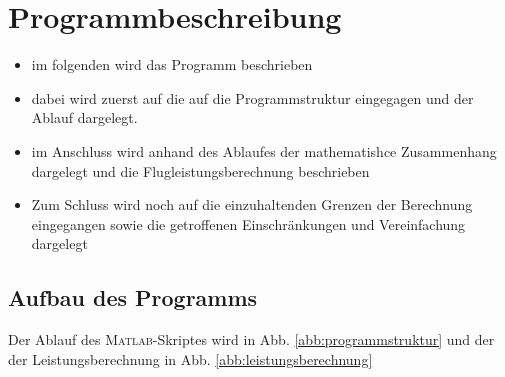 \chapter{Programmbeschreibung}
\label{chap:Programmbeschreibung}
\begin{itemize}
	\item im folgenden wird das Programm beschrieben
	\item dabei wird zuerst auf die auf die Programmstruktur eingegagen und der Ablauf dargelegt. 
	\item im Anschluss wird anhand des Ablaufes der mathematishce Zusammenhang dargelegt und die Flugleistungsberechnung beschrieben
	\item Zum Schluss wird noch auf die einzuhaltenden Grenzen der Berechnung eingegangen sowie die getroffenen Einschränkungen und Vereinfachung dargelegt
\end{itemize}

\section{Aufbau des Programms}
\label{sec:aufbau_des_programms}
Der Ablauf des \textsc{Matlab}-Skriptes wird in Abb. \ref{abb:programmstruktur} und der der Leistungsberechnung in Abb. \ref{abb:leistungsberechnung}

